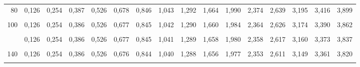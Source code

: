 \documentclass[
  ngerman,
]{article}
\begin{document}
\begin{table}[!h]
{\begin{tabular}{>{}r|rrrrrrrrrrrrrrr}
80 & 0,126 & 0,254 & 0,387 & 0,526 & 0,678 & 0,846 & 1,043 & 1,292 & 1,664 & 1,990 & 2,374 & 2,639 & 3,195 & 3,416 & 3,899\\
\cellcolor{gray!6}{90} & \cellcolor{gray!6}{0,126} & \cellcolor{gray!6}{0,254} & \cellcolor{gray!6}{0,387} & \cellcolor{gray!6}{0,526} & \cellcolor{gray!6}{0,677} & \cellcolor{gray!6}{0,846} & \cellcolor{gray!6}{1,042} & \cellcolor{gray!6}{1,291} & \cellcolor{gray!6}{1,662} & \cellcolor{gray!6}{1,987} & \cellcolor{gray!6}{2,368} & \cellcolor{gray!6}{2,632} & \cellcolor{gray!6}{3,183} & \cellcolor{gray!6}{3,402} & \cellcolor{gray!6}{3,878}\\
100 & 0,126 & 0,254 & 0,386 & 0,526 & 0,677 & 0,845 & 1,042 & 1,290 & 1,660 & 1,984 & 2,364 & 2,626 & 3,174 & 3,390 & 3,862\\
\cellcolor{gray!6}{110} & \cellcolor{gray!6}{0,126} & \cellcolor{gray!6}{0,254} & \cellcolor{gray!6}{0,386} & \cellcolor{gray!6}{0,526} & \cellcolor{gray!6}{0,677} & \cellcolor{gray!6}{0,845} & \cellcolor{gray!6}{1,041} & \cellcolor{gray!6}{1,289} & \cellcolor{gray!6}{1,659} & \cellcolor{gray!6}{1,982} & \cellcolor{gray!6}{2,361} & \cellcolor{gray!6}{2,621} & \cellcolor{gray!6}{3,166} & \cellcolor{gray!6}{3,381} & \cellcolor{gray!6}{3,848}\\
\addlinespace
120 & 0,126 & 0,254 & 0,386 & 0,526 & 0,677 & 0,845 & 1,041 & 1,289 & 1,658 & 1,980 & 2,358 & 2,617 & 3,160 & 3,373 & 3,837\\
\cellcolor{gray!6}{130} & \cellcolor{gray!6}{0,126} & \cellcolor{gray!6}{0,254} & \cellcolor{gray!6}{0,386} & \cellcolor{gray!6}{0,526} & \cellcolor{gray!6}{0,676} & \cellcolor{gray!6}{0,844} & \cellcolor{gray!6}{1,041} & \cellcolor{gray!6}{1,288} & \cellcolor{gray!6}{1,657} & \cellcolor{gray!6}{1,978} & \cellcolor{gray!6}{2,355} & \cellcolor{gray!6}{2,614} & \cellcolor{gray!6}{3,154} & \cellcolor{gray!6}{3,367} & \cellcolor{gray!6}{3,828}\\
140 & 0,126 & 0,254 & 0,386 & 0,526 & 0,676 & 0,844 & 1,040 & 1,288 & 1,656 & 1,977 & 2,353 & 2,611 & 3,149 & 3,361 & 3,820\\
\cellcolor{gray!6}{150} & \cellcolor{gray!6}{0,126} & \cellcolor{gray!6}{0,254} & \cellcolor{gray!6}{0,386} & \cellcolor{gray!6}{0,526} & \cellcolor{gray!6}{0,676} & \cellcolor{gray!6}{0,844} & \cellcolor{gray!6}{1,040} & \cellcolor{gray!6}{1,287} & \cellcolor{gray!6}{1,655} & \cellcolor{gray!6}{1,976} & \cellcolor{gray!6}{2,351} & \cellcolor{gray!6}{2,609} & \cellcolor{gray!6}{3,145} & \cellcolor{gray!6}{3,357} & \cellcolor{gray!6}{3,813}\\

\end{tabular}}
\end{table}
\end{document}
